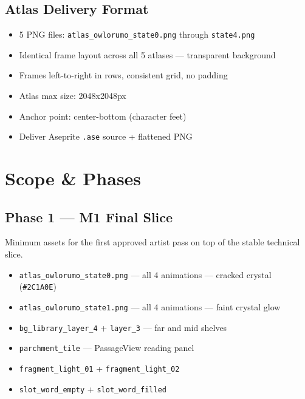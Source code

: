 \documentclass[11pt, a4paper]{article}
\newcommand{\hex}[1]{\textcolor[HTML]{#1}{\texttt{\##1}}}
\begin{document}
\subsection{Atlas Delivery Format}
\begin{itemize}[leftmargin=1.5em, itemsep=2pt]
  \item 5 PNG files: \texttt{atlas\_owlorumo\_state0.png} through \texttt{state4.png}
  \item Identical frame layout across all 5 atlases --- transparent background
  \item Frames left-to-right in rows, consistent grid, no padding
  \item Atlas max size: 2048x2048px
  \item Anchor point: center-bottom (character feet)
  \item Deliver Aseprite \texttt{.ase} source + flattened PNG
\end{itemize}

\section{Scope \& Phases}

\subsection{Phase 1 --- M1 Final Slice}

Minimum assets for the first approved artist pass on top of the stable technical slice.

\begin{itemize}[leftmargin=1.5em, itemsep=2pt]
  \item[\textbf{!}] \texttt{atlas\_owlorumo\_state0.png} --- all 4 animations --- cracked crystal (\hex{2C1A0E})
  \item[\textbf{!}] \texttt{atlas\_owlorumo\_state1.png} --- all 4 animations --- faint crystal glow
  \item[\textbf{!}] \texttt{bg\_library\_layer\_4} + \texttt{layer\_3} --- far and mid shelves
  \item[\textbf{!}] \texttt{parchment\_tile} --- PassageView reading panel
  \item[\textbf{!}] \texttt{fragment\_light\_01} + \texttt{fragment\_light\_02}
  \item[\textbf{!}] \texttt{slot\_word\_empty} + \texttt{slot\_word\_filled}
\end{itemize}
\end{document}
